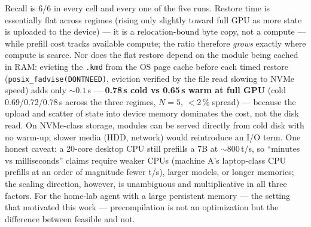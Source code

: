 \documentclass[11pt]{article}
\newcommand{\kmd}{\texttt{.kmd}}
\newcommand{\code}[1]{\texttt{#1}}
\begin{document}
Recall is 6/6 in every cell and every one of the five runs. Restore time is essentially flat across regimes (rising only slightly toward full GPU as more state is uploaded to the device) --- it is a relocation-bound byte copy, not a compute --- while prefill cost tracks available compute; the ratio therefore \emph{grows} exactly where compute is scarce. Nor does the flat restore depend on the module being cached in RAM: evicting the \kmd{} from the OS page cache before each timed restore (\code{posix\_fadvise(DONTNEED)}, eviction verified by the file read slowing to NVMe speed) adds only ${\sim}0.1$\,s --- \textbf{0.78\,s cold vs 0.65\,s warm at full GPU} (cold 0.69/0.72/0.78\,s across the three regimes, $N{=}5$, ${<}2\,\%$ spread) --- because the upload and scatter of state into device memory dominates the cost, not the disk read. On NVMe-class storage, modules can be served directly from cold disk with no warm-up; slower media (HDD, network) would reintroduce an I/O term. One honest caveat: a 20-core desktop CPU still prefills a 7B at ${\sim}800$\,t/s, so ``minutes vs milliseconds'' claims require weaker CPUs (machine A's laptop-class CPU prefills at an order of magnitude fewer t/s), larger models, or longer memories; the scaling direction, however, is unambiguous and multiplicative in all three factors. For the home-lab agent with a large persistent memory --- the setting that motivated this work --- precompilation is not an optimization but the difference between feasible and not.
\end{document}
